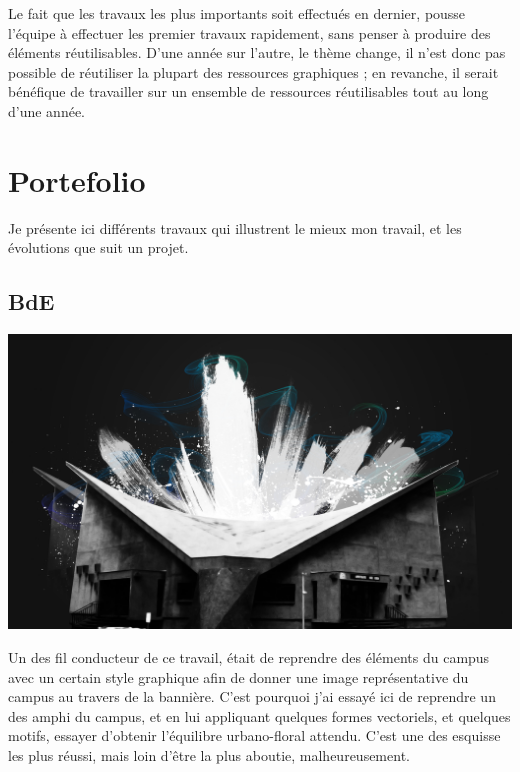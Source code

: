         Le fait que les travaux les plus importants soit effectués en dernier, pousse l'équipe à effectuer les premier travaux rapidement, sans penser à produire des éléments réutilisables.
        D'une année sur l'autre, le thème change, il n'est donc pas possible de réutiliser la plupart des ressources graphiques ; en revanche, il serait bénéfique de travailler sur un ensemble de ressources réutilisables tout au long d'une année.

\newpage

\section{Portefolio}

    Je présente ici différents travaux qui illustrent le mieux mon travail, et les évolutions que suit un projet.
    \subsection{BdE}
        \begin{center}
            \includegraphics[width=\textwidth]{img/amphi.jpg}\\
        \end{center}
        
                    Un des fil conducteur de ce travail, était de reprendre des éléments du campus avec un certain style graphique afin de donner une image représentative du campus au travers de la bannière.
	        C'est pourquoi j'ai essayé ici de reprendre un des amphi du campus, et en lui appliquant quelques formes vectoriels, et quelques motifs, essayer d'obtenir l'équilibre urbano-floral attendu.
            C'est une des esquisse les plus réussi, mais loin d'être la plus aboutie, malheureusement.

